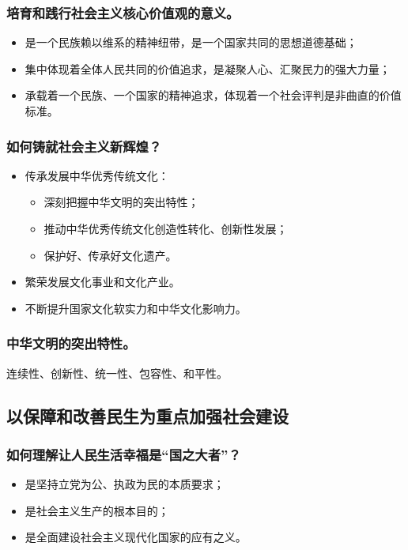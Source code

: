 \documentclass{article}
\begin{document}
\subsubsection{培育和践行社会主义核心价值观的意义。}
\begin{itemize}
    \item 是一个民族赖以维系的精神纽带，是一个国家共同的思想道德基础；
    \item 集中体现着全体人民共同的价值追求，是凝聚人心、汇聚民力的强大力量；
    \item 承载着一个民族、一个国家的精神追求，体现着一个社会评判是非曲直的价值标准。
\end{itemize}

\subsubsection{如何铸就社会主义新辉煌？}
\begin{itemize}
    \item 传承发展中华优秀传统文化：
    \begin{itemize}
        \item 深刻把握中华文明的突出特性；
        \item 推动中华优秀传统文化创造性转化、创新性发展；
        \item 保护好、传承好文化遗产。
    \end{itemize}
    \item 繁荣发展文化事业和文化产业。
    \item 不断提升国家文化软实力和中华文化影响力。
\end{itemize}

\subsubsection{中华文明的突出特性。}
连续性、创新性、统一性、包容性、和平性。

\subsection{以保障和改善民生为重点加强社会建设}

\subsubsection{如何理解让人民生活幸福是“国之大者”？}
\begin{itemize}
    \item 是坚持立党为公、执政为民的本质要求；
    \item 是社会主义生产的根本目的；
    \item 是全面建设社会主义现代化国家的应有之义。
\end{itemize}
\end{document}

